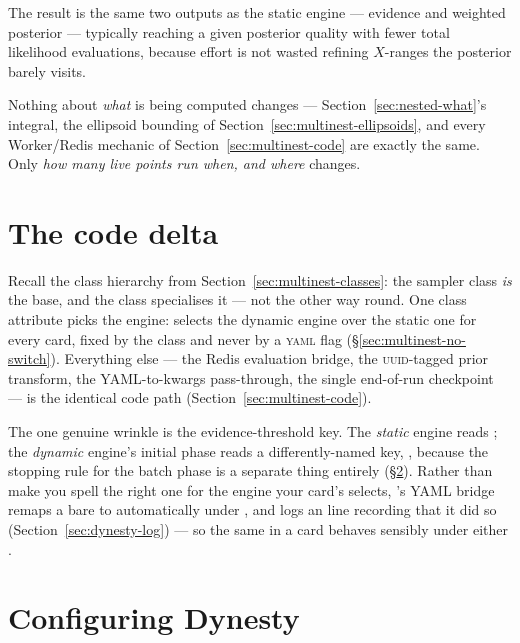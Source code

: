 The result is the same two outputs as the static engine --- evidence and weighted
posterior --- typically reaching a given posterior quality with fewer total
likelihood evaluations, because effort is not wasted refining $X$-ranges the
posterior barely visits.

\begin{jnote}
Nothing about \emph{what} is being computed changes --- Section~\ref{sec:nested-what}'s
integral, the ellipsoid bounding of Section~\ref{sec:multinest-ellipsoids}, and every
Worker/Redis mechanic of Section~\ref{sec:multinest-code} are exactly the same. Only
\emph{how many live points run when, and where} changes.
\end{jnote}

\section{The code delta}
\label{sec:dynesty-code}

Recall the class hierarchy from Section~\ref{sec:multinest-classes}: the
 sampler class \emph{is} the base, and the  class
specialises it --- not the other way round. One class attribute picks the engine:
 selects the dynamic engine over the static one for
every  card, fixed by the class and never by a
\textsc{yaml} flag (\S\ref{sec:multinest-no-switch}). Everything else --- the Redis
evaluation bridge, the \textsc{uuid}-tagged prior transform, the YAML-to-kwargs
pass-through, the single end-of-run checkpoint --- is the identical code path
(Section~\ref{sec:multinest-code}).

The one genuine wrinkle is the evidence-threshold key. The \emph{static} engine reads
; the \emph{dynamic} engine's initial phase reads a differently-named
key, , because the stopping rule for the batch phase is a
separate thing entirely (\S\ref{sec:dynesty-yaml}). Rather than make you spell the
right one for the engine your card's  selects, \Jtwo's YAML bridge
remaps a bare  to  automatically under
, and logs an  line recording that it did so
(Section~\ref{sec:dynesty-log}) --- so the same  in a card
behaves sensibly under either .

\section{Configuring Dynesty}
\label{sec:dynesty-yaml}

